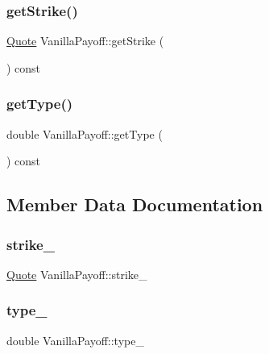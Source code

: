 \subsubsection{\texorpdfstring{get\+Strike()}{getStrike()}}
{\footnotesize\ttfamily \hyperlink{_name_def_8h_a642a6c5fd87319d922637de0e0bb0305}{Quote} Vanilla\+Payoff\+::get\+Strike (\begin{DoxyParamCaption}{ }\end{DoxyParamCaption}) const}

\hypertarget{class_vanilla_payoff_ac1b4cc9e4152ed3f7c07c71270fc1831}{}\label{class_vanilla_payoff_ac1b4cc9e4152ed3f7c07c71270fc1831} 
\subsubsection{\texorpdfstring{get\+Type()}{getType()}}
{\footnotesize\ttfamily double Vanilla\+Payoff\+::get\+Type (\begin{DoxyParamCaption}{ }\end{DoxyParamCaption}) const}



\subsection{Member Data Documentation}
\hypertarget{class_vanilla_payoff_a63c2c23fecb9b43cd250e28791a31a56}{}\label{class_vanilla_payoff_a63c2c23fecb9b43cd250e28791a31a56} 
\subsubsection{\texorpdfstring{strike\+\_\+}{strike\_}}
{\footnotesize\ttfamily \hyperlink{_name_def_8h_a642a6c5fd87319d922637de0e0bb0305}{Quote} Vanilla\+Payoff\+::strike\+\_\+\hspace{0.3cm}{\ttfamily [private]}}

\hypertarget{class_vanilla_payoff_a4a09d08187de77df248cc3f7498e3e2f}{}\label{class_vanilla_payoff_a4a09d08187de77df248cc3f7498e3e2f} 
\subsubsection{\texorpdfstring{type\+\_\+}{type\_}}
{\footnotesize\ttfamily double Vanilla\+Payoff\+::type\+\_\+\hspace{0.3cm}{\ttfamily [private]}}



